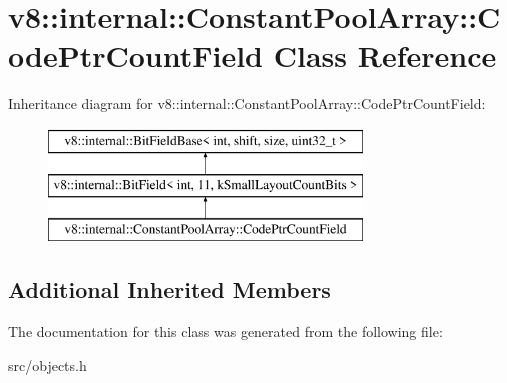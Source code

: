 \hypertarget{classv8_1_1internal_1_1_constant_pool_array_1_1_code_ptr_count_field}{}\section{v8\+:\+:internal\+:\+:Constant\+Pool\+Array\+:\+:Code\+Ptr\+Count\+Field Class Reference}
\label{classv8_1_1internal_1_1_constant_pool_array_1_1_code_ptr_count_field}
Inheritance diagram for v8\+:\+:internal\+:\+:Constant\+Pool\+Array\+:\+:Code\+Ptr\+Count\+Field\+:\begin{figure}[H]
\begin{center}
\leavevmode
\includegraphics[height=3.000000cm]{classv8_1_1internal_1_1_constant_pool_array_1_1_code_ptr_count_field}
\end{center}
\end{figure}
\subsection*{Additional Inherited Members}


The documentation for this class was generated from the following file\+:\begin{DoxyCompactItemize}
\item 
src/objects.\+h\end{DoxyCompactItemize}
